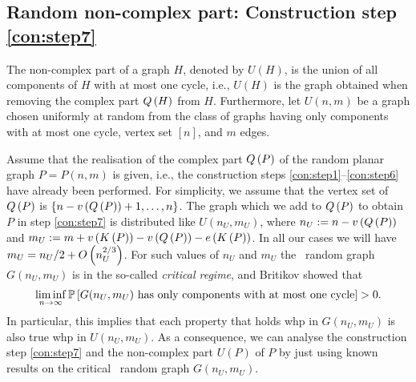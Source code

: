 \subsection[Random non-complex part]{Random non-complex part: Construction step \ref{con:step7}}\label{sub:random_noncomplex_part}
The non-complex part of a graph $H$, denoted by $U(H)$, is the union of all components of $H$ with at most one cycle, i.e., $U(H)$ is the graph obtained when removing the complex part $Q\left(H\right)$ from $H$. Furthermore, let $U(n,m)$ be a graph chosen uniformly at random from the class of graphs having only components with at most one cycle, vertex set $[n]$, and $m$ edges.

Assume that the realisation of the complex part $Q\left(P\right)$ of the random planar graph $P=P(n,m)$ is given, i.e., the construction steps \ref{con:step1}--\ref{con:step6} have already been performed. For simplicity, we assume that the vertex set of $Q\left(P\right)$ is $\left\{n-v\left({Q\left(P\right)}\right)+1, \ldots, n\right\}$. The graph which we add to $Q\left(P\right)$ to obtain $P$ in step \ref{con:step7} is distributed like $U(n_U, m_U)$, where $n_U:=n-v\left({Q\left(P\right)}\right)$ and $m_U:=m+v\left({K\left(P\right)}\right)-v\left({Q\left(P\right)}\right)-e\left({K\left(P\right)}\right)$. In all our cases we will have $m_U=n_U/2+O\left(n_U^{2/3}\right)$. For such values of $n_U$ and $m_U$ the \ER\ random graph $G(n_U, m_U)$ is in the so-called {\em critical regime}, and Britikov \cite{Britikov1989} showed that
\begin{align*}
    \liminf_{n\to\infty}\mathbb{P}\left[G(n_U,m_U)\text{ has only components with at most one cycle}\right]>0.
\end{align*}
In particular, this implies that each property that holds whp in $G(n_U, m_U)$ is also true whp in $U(n_U, m_U)$. As a consequence, we can analyse the construction step \ref{con:step7} and the non-complex part $U(P)$ of $P$ by just using known results on the critical \ER\ random graph $G(n_U, m_U)$.

